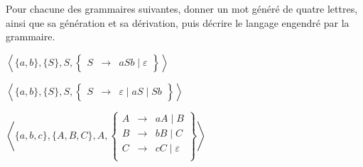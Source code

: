 
\begingroup

\begin{exercice}\label{exo:parsing/grammars/read_grammars}

  Pour chacune des grammaires suivantes, donner un mot généré de quatre lettres,
  ainsi que sa génération et sa dérivation, puis décrire le langage engendré par la grammaire. 
  \begin{questions}
  \item $\left\langle \{a, b\}, \{S\}, S,
    \left\{\begin{array}{rcl}
    S &\rightarrow& a S b \mid  \varepsilon
    \end{array}\right\}  \right\rangle$
  \item $\left\langle \{a, b\}, \{S\}, S,
    \left\{\begin{array}{rcl}
    S   &\rightarrow& \varepsilon \mid  aS \mid  Sb
    \end{array}\right\}  \right\rangle$
  \item $\left\langle \{a, b, c\}, \{A, B, C\}, A,
    \left\{\begin{array}{rcl}
    A   &\rightarrow& aA \mid  B \\
    B   &\rightarrow& bB \mid  C \\
    C   &\rightarrow& cC \mid  \varepsilon\\
    \end{array}\right\}  \right\rangle$
  \end{questions}

\end{exercice}

